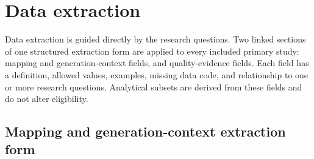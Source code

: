 \section{Data extraction}
\label{sec:protocol_extraction}

Data extraction is guided directly by the research questions. Two linked sections of one structured extraction form are applied to every included primary study: mapping and generation-context fields, and quality-evidence fields. Each field has a definition, allowed values, examples, missing data code, and relationship to one or more research questions. Analytical subsets are derived from these fields and do not alter eligibility.

\subsection{Mapping and generation-context extraction form}

